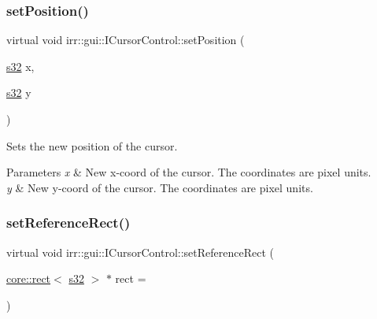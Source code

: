 \subsubsection{\texorpdfstring{set\+Position()}{setPosition()}\hspace{0.1cm}{\footnotesize\ttfamily [4/4]}}
{\footnotesize\ttfamily virtual void irr\+::gui\+::\+I\+Cursor\+Control\+::set\+Position (\begin{DoxyParamCaption}\item[{\hyperlink{namespaceirr_ac66849b7a6ed16e30ebede579f9b47c6}{s32}}]{x,  }\item[{\hyperlink{namespaceirr_ac66849b7a6ed16e30ebede579f9b47c6}{s32}}]{y }\end{DoxyParamCaption})\hspace{0.3cm}{\ttfamily [pure virtual]}}



Sets the new position of the cursor. 


\begin{DoxyParams}{Parameters}
{\em x} & New x-\/coord of the cursor. The coordinates are pixel units. \\
\hline
{\em y} & New y-\/coord of the cursor. The coordinates are pixel units. \\
\hline
\end{DoxyParams}
\mbox{\label{classirr_1_1gui_1_1ICursorControl_a2a7428ef716a60f8f4b86361a69b8770}} 
\subsubsection{\texorpdfstring{set\+Reference\+Rect()}{setReferenceRect()}}
{\footnotesize\ttfamily virtual void irr\+::gui\+::\+I\+Cursor\+Control\+::set\+Reference\+Rect (\begin{DoxyParamCaption}\item[{\hyperlink{classirr_1_1core_1_1rect}{core\+::rect}$<$ \hyperlink{namespaceirr_ac66849b7a6ed16e30ebede579f9b47c6}{s32} $>$ $\ast$}]{rect = {} }\end{DoxyParamCaption})\hspace{0.3cm}{\ttfamily [pure virtual]}}



